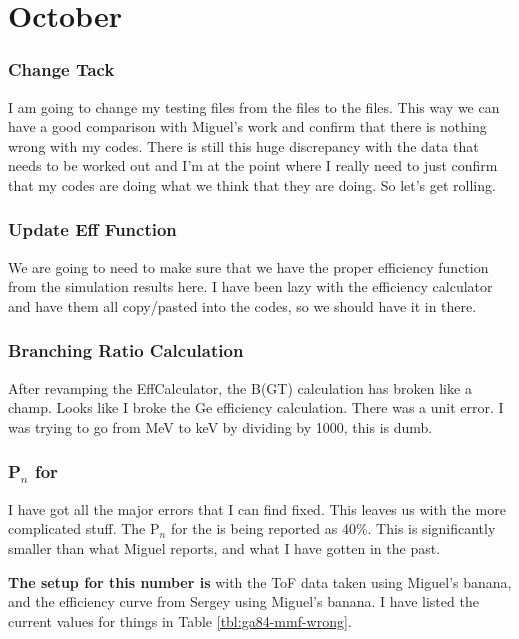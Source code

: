 \chapter{October}
\subsection{Change Tack}
I am going to change my testing files from the  files to the 
 files. This way we can have a good comparison with Miguel's work
and confirm that there is nothing wrong with my codes. There is still this 
huge discrepancy with the  data that needs to be worked out and
I'm at the point where I really need to just confirm that my codes are doing 
what we think that they are doing. So let's get rolling.

\subsection{Update Eff Function}
We are going to need to make sure that we have the proper efficiency function 
from the simulation results here. I have been lazy with the efficiency 
calculator and have them all copy/pasted into the codes, so we should have it 
in there.

\subsection{Branching Ratio Calculation}
After revamping the EffCalculator, the B(GT) calculation has broken like a 
champ. Looks like I broke the Ge efficiency calculation. There was a unit error. 
I was trying to go from MeV to keV by dividing by 1000, this is dumb.

\subsection{P$_n$ for }
I have got all the major errors that I can find fixed. This leaves us with the 
more complicated stuff. The P$_n$ for the  is being reported as 
40\%. This is significantly smaller than what Miguel reports, and what I have
gotten in the past. 

\textbf{The setup for this number is } with the ToF data taken using Miguel's 
banana, and the efficiency curve from Sergey using Miguel's banana. I have 
listed the current values for things in Table \ref{tbl:ga84-mmf-wrong}.

